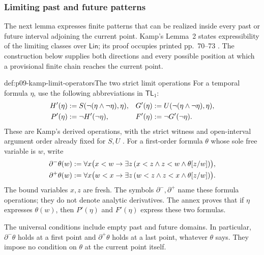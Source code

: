 
\subsubsection{Limiting past and future patterns}
\label{sec:p09-kamp-iii2-lemma2}

The next lemma expresses finite patterns that can be realized inside every
past or future interval adjoining the current point.  Kamp's Lemma~2 states
expressibility of the limiting classes over \(\mathsf{Lin}\); its proof
occupies printed pp.~70--73 \cite[ch.~III, lemma~2, pp.~66--73]{Kamp1968}.
The construction below supplies both directions and every possible position
at which a provisional finite chain reaches the current point.

\begin{hbdefinition}{def:p09-kamp-limit-operators}{The two strict limit operations}
For a temporal formula \(\eta\), use the following abbreviations in
\(\mathsf{TL}_1\):
\[
\begin{aligned}
 H'(\eta)&\mathrel{:=} S(\neg(\eta\land\neg\eta),\eta),&
 G'(\eta)&\mathrel{:=} U(\neg(\eta\land\neg\eta),\eta),\\
 P'(\eta)&\mathrel{:=}\neg H'(\neg\eta),&
 F'(\eta)&\mathrel{:=}\neg G'(\neg\eta).
\end{aligned}
\]
These are Kamp's derived operations, with the strict witness and open-interval
argument order already fixed for \(S,U\)
\cite[ch.~III, defs.~10--11, pp.~57--59]{Kamp1968}.
For a first-order formula \(\theta\) whose sole free variable is \(w\),
write
\[
\begin{aligned}
 \partial^-\theta(w)&\mathrel{:=}
   \forall x\bigl(x<w\to\exists z\,
        (x<z\land z<w\land\theta[z/w])\bigr),\\
 \partial^+\theta(w)&\mathrel{:=}
   \forall x\bigl(w<x\to\exists z\,
        (w<z\land z<x\land\theta[z/w])\bigr).
\end{aligned}
\]
The bound variables \(x,z\) are fresh.  The symbols \(\partial^-,\partial^+\)
name these formula operations; they do not denote analytic derivatives.
The annex proves that if \(\eta\) expresses \(\theta(w)\), then
\(P'(\eta)\) and \(F'(\eta)\) express these two formulas.

The universal conditions include empty past and future domains.  In
particular, \(\partial^-\theta\) holds at a first point and
\(\partial^+\theta\) holds at a last point, whatever \(\theta\) says.
They impose no condition on \(\theta\) at the current point itself.
\end{hbdefinition}

